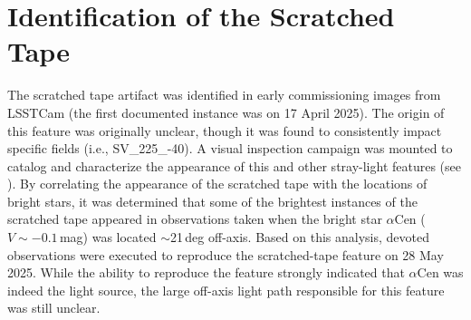 \documentclass[SE,authoryear,toc]{lsstdoc}
\begin{document}
\section{Identification of the Scratched Tape}
\label{sec:identification}

The scratched tape artifact was identified in early commissioning images from LSSTCam (the first documented instance was on 17 April 2025). The origin of this feature was originally unclear, though it was found to consistently impact specific fields (i.e., SV\_225\_-40). A visual inspection campaign was mounted to catalog and characterize the appearance of this and other stray-light features (see \citealt{SITCOMTN-160}). By correlating the appearance of the scratched tape with the locations of bright stars, it was determined that some of the brightest instances of the scratched tape appeared in observations taken when the bright star $\alpha$Cen ($V \sim -0.1$\,mag) was located $\sim$21\,deg off-axis. Based on this analysis, devoted observations were executed to reproduce the scratched-tape feature on 28 May 2025. While the ability to reproduce the feature strongly indicated that $\alpha$Cen was indeed the light source, the large off-axis light path responsible for this feature was still unclear.
\end{document}

